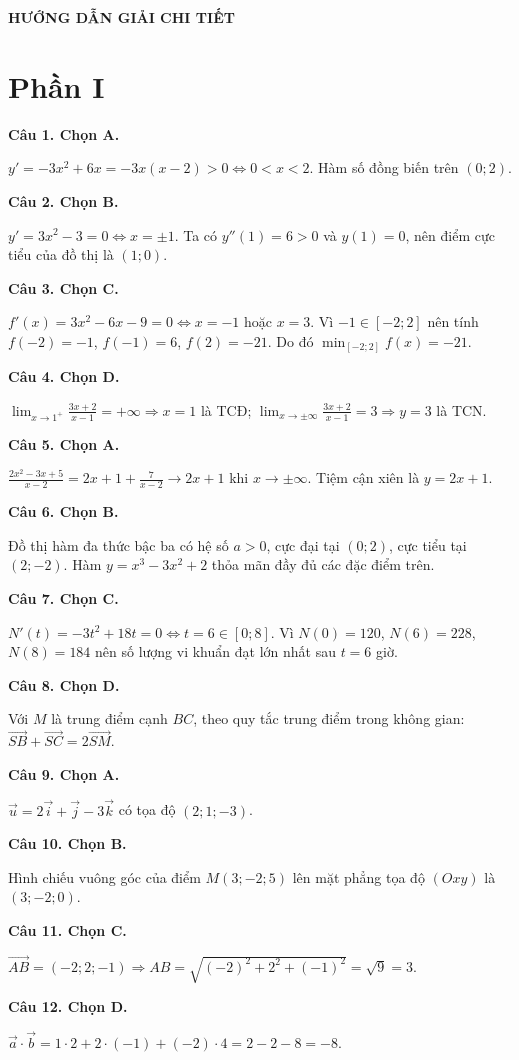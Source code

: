 \documentclass[12pt,a4paper]{article}
\newcommand{\loigiai}[1]{\par\medskip\Needspace{3\baselineskip}\noindent\textbf{#1}\par\nobreak}
\begin{document}
\newpage
\begin{center}\Large\textbf{HƯỚNG DẪN GIẢI CHI TIẾT}\end{center}
\section*{\large Phần I}
\loigiai{Câu 1. Chọn A.}
$y'=-3x^2+6x=-3x(x-2)>0\Leftrightarrow 0<x<2$. Hàm số đồng biến trên $(0;2)$.

\loigiai{Câu 2. Chọn B.}
$y'=3x^2-3=0\Leftrightarrow x=\pm1$. Ta có $y''(1)=6>0$ và $y(1)=0$, nên điểm cực tiểu của đồ thị là $(1;0)$.

\loigiai{Câu 3. Chọn C.}
$f'(x)=3x^2-6x-9=0\Leftrightarrow x=-1$ hoặc $x=3$. Vì $-1\in[-2;2]$ nên tính $f(-2)=-1$, $f(-1)=6$, $f(2)=-21$. Do đó $\min_{[-2;2]}f(x)=-21$.

\loigiai{Câu 4. Chọn D.}
$\lim_{x\to1^+}\frac{3x+2}{x-1}=+\infty\Rightarrow x=1$ là TCĐ; $\lim_{x\to\pm\infty}\frac{3x+2}{x-1}=3\Rightarrow y=3$ là TCN.

\loigiai{Câu 5. Chọn A.}
$\frac{2x^2-3x+5}{x-2}=2x+1+\frac{7}{x-2}\to 2x+1$ khi $x\to\pm\infty$. Tiệm cận xiên là $y=2x+1$.

\loigiai{Câu 6. Chọn B.}
Đồ thị hàm đa thức bậc ba có hệ số $a>0$, cực đại tại $(0;2)$, cực tiểu tại $(2;-2)$. Hàm $y=x^3-3x^2+2$ thỏa mãn đầy đủ các đặc điểm trên.

\loigiai{Câu 7. Chọn C.}
$N'(t)=-3t^2+18t=0\Leftrightarrow t=6\in[0;8]$. Vì $N(0)=120$, $N(6)=228$, $N(8)=184$ nên số lượng vi khuẩn đạt lớn nhất sau $t=6$ giờ.

\loigiai{Câu 8. Chọn D.}
Với $M$ là trung điểm cạnh $BC$, theo quy tắc trung điểm trong không gian: $\overrightarrow{SB}+\overrightarrow{SC}=2\overrightarrow{SM}$.

\loigiai{Câu 9. Chọn A.}
$\vec u=2\vec i+\vec j-3\vec k$ có tọa độ $(2;1;-3)$.

\loigiai{Câu 10. Chọn B.}
Hình chiếu vuông góc của điểm $M(3;-2;5)$ lên mặt phẳng tọa độ $(Oxy)$ là $(3;-2;0)$.

\loigiai{Câu 11. Chọn C.}
$\overrightarrow{AB}=(-2;2;-1)\Rightarrow AB=\sqrt{(-2)^2+2^2+(-1)^2}=\sqrt9=3$.

\loigiai{Câu 12. Chọn D.}
$\vec a\cdot\vec b=1\cdot2+2\cdot(-1)+(-2)\cdot4=2-2-8=-8$.

\newpage
\end{document}
